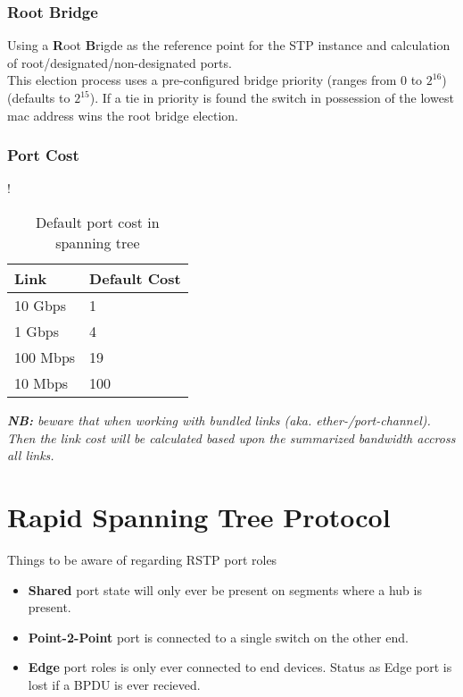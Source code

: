 \subsubsection{Root Bridge}
Using a \textbf{R}oot \textbf{B}rigde as the reference point for the STP instance and calculation of root/designated/non-designated ports.\\This election process uses a pre-configured bridge priority (ranges from $0$ to $2^{16}$) (defaults to $2^{15}$). If a tie in priority is found the switch in possession of the lowest mac address wins the root bridge election.


\subsubsection{Port Cost}

\begin{table}[h]
	\centering
	\caption{Default port cost in spanning tree}
	\label{stpportcost}{!}{%
		\begin{tabular}{|l|l|}
			\hline
			\textbf{Link} & \textbf{Default Cost} \\ \hline
			10 Gbps       & 1                     \\ \hline
			1 Gbps        & 4                     \\ \hline
			100 Mbps      & 19                    \\ \hline
			10 Mbps       & 100                   \\ \hline
		\end{tabular}%
	}
\end{table}


\textit{\textbf{NB:} beware that when working with bundled links (aka. ether-/port-channel). Then the link cost will be calculated based upon the summarized bandwidth accross all links.}


\section{Rapid Spanning Tree Protocol}



Things to be aware of regarding RSTP port roles
\begin{itemize}
    \item \textbf{Shared} port state will only ever be present on segments where a hub is present.
    \item \textbf{Point-2-Point} port is connected to a single switch on the other end.
    \item \textbf{Edge} port roles is only ever connected to end devices. Status as Edge port is lost if a BPDU is ever recieved.
\end{itemize}

